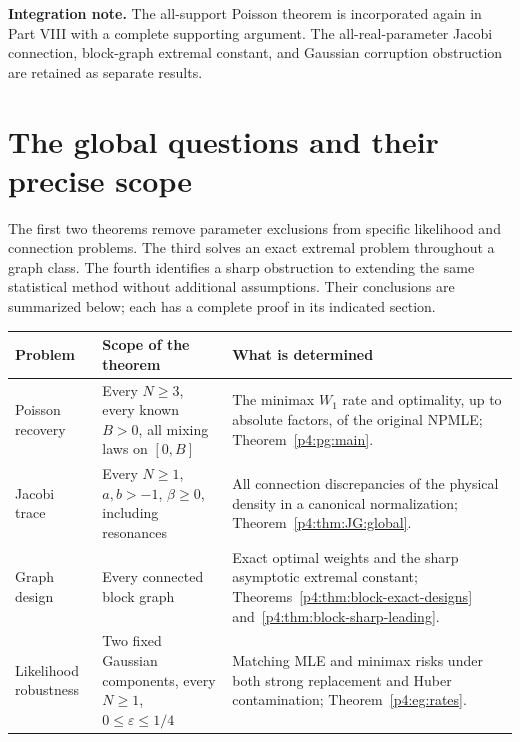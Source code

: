 \documentclass[11pt,a4paper]{article}
\theoremstyle{definition}
\theoremstyle{remark}
\numberwithin{equation}{section}
\begin{document}
\noindent\textbf{Integration note.} The all-support Poisson theorem is incorporated again in Part VIII with a complete supporting argument. The all-real-parameter Jacobi connection, block-graph extremal constant, and Gaussian corruption obstruction are retained as separate results.
\clearpage

\section{The global questions and their precise scope}

The first two theorems remove parameter exclusions from specific
likelihood and connection problems. The third solves an exact extremal
problem throughout a graph class. The fourth identifies a sharp
obstruction to extending the same statistical method without additional
assumptions. Their conclusions are summarized below; each has a complete
proof in its indicated section.

\begin{center}
\small
\renewcommand{\arraystretch}{1.23}
\begin{tabular}{@{}>{\raggedright\arraybackslash}p{2.4cm}>{\raggedright\arraybackslash}p{5.6cm}>{\raggedright\arraybackslash}p{6.9cm}@{}}
\toprule
Problem & Scope of the theorem & What is determined \\
\midrule
Poisson recovery & Every $N\ge3$, every known $B>0$, all mixing laws on $[0,B]$ & The minimax $W_1$ rate and optimality, up to absolute factors, of the original NPMLE; Theorem~\ref{p4:pg:main}. \\
Jacobi trace & Every $N\ge1$, $a,b>-1$, $\beta\ge0$, including resonances & All connection discrepancies of the physical density in a canonical normalization; Theorem~\ref{p4:thm:JG:global}. \\
Graph design & Every connected block graph & Exact optimal weights and the sharp asymptotic extremal constant; Theorems~\ref{p4:thm:block-exact-designs} and~\ref{p4:thm:block-sharp-leading}. \\
Likelihood robustness & Two fixed Gaussian components, every $N\ge1$, $0\le\varepsilon\le1/4$ & Matching MLE and minimax risks under both strong replacement and Huber contamination; Theorem~\ref{p4:eg:rates}. \\
\bottomrule
\end{tabular}
\end{center}
\end{document}
